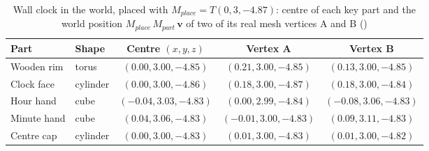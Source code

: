 \begin{table}[H]\centering\footnotesize
\caption{Wall clock in the world, placed with $M_{place}=T(0, 3, -4.87)$: centre of each key part and the world position $M_{place}\,M_{part}\,\mathbf{v}$ of two of its real mesh vertices A and B ()}\label{tab:world_clock}
\begin{tabular}{@{}l l c c c@{}}
\toprule
Part & Shape & Centre $(x,y,z)$ & Vertex A & Vertex B \\
\midrule
Wooden rim & torus & $(0.00, 3.00, -4.85)$ & $(0.21, 3.00, -4.85)$ & $(0.13, 3.00, -4.85)$ \\
Clock face & cylinder & $(0.00, 3.00, -4.86)$ & $(0.18, 3.00, -4.87)$ & $(0.18, 3.00, -4.84)$ \\
Hour hand & cube & $(-0.04, 3.03, -4.83)$ & $(0.00, 2.99, -4.84)$ & $(-0.08, 3.06, -4.83)$ \\
Minute hand & cube & $(0.04, 3.06, -4.83)$ & $(-0.01, 3.00, -4.83)$ & $(0.09, 3.11, -4.83)$ \\
Centre cap & cylinder & $(0.00, 3.00, -4.83)$ & $(0.01, 3.00, -4.83)$ & $(0.01, 3.00, -4.82)$ \\
\bottomrule
\end{tabular}
\end{table}
